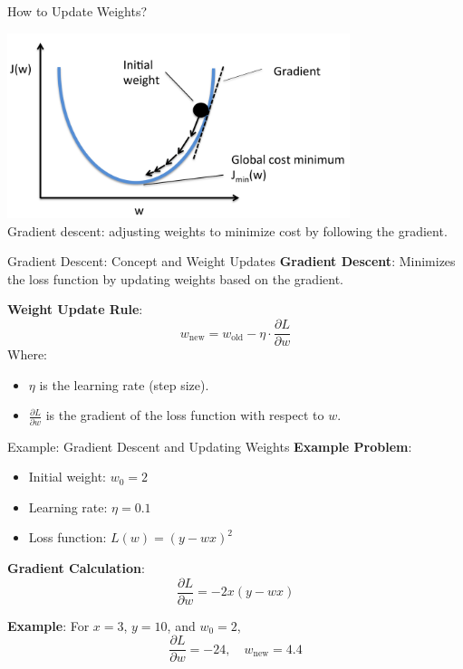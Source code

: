 \documentclass[serif, aspectratio=169]{beamer}
\begin{document}
\begin{frame}{How to Update Weights?}

    \begin{center}
        \includegraphics[width=10cm]{pic/ball.png}\\
        {Gradient descent: adjusting weights to minimize cost by following the gradient.}
    \end{center}
\end{frame}



\begin{frame}{Gradient Descent: Concept and Weight Updates}
    \textbf{Gradient Descent}: Minimizes the loss function by updating weights based on the gradient.

    \textbf{Weight Update Rule}:
    \[
    w_{\text{new}} = w_{\text{old}} - \eta \cdot \frac{\partial L}{\partial w}
    \]
    Where:
    \begin{itemize}
        \item \( \eta \) is the learning rate (step size).
        \item \( \frac{\partial L}{\partial w} \) is the gradient of the loss function with respect to \( w \).
    \end{itemize}
\end{frame}

\begin{frame}{Example: Gradient Descent and Updating Weights}
    \textbf{Example Problem}:
    \begin{itemize}
        \item Initial weight: \( w_0 = 2 \)
        \item Learning rate: \( \eta = 0.1 \)
        \item Loss function: \( L(w) = (y - wx)^2 \)
    \end{itemize}
    
    \textbf{Gradient Calculation}:
    \[
    \frac{\partial L}{\partial w} = -2x(y - wx)
    \]
    
    \textbf{Example}: For \( x = 3 \), \( y = 10 \), and \( w_0 = 2 \),
    \[
    \frac{\partial L}{\partial w} = -24, \quad w_{\text{new}} = 4.4
    \]
\end{frame}
\end{document}
